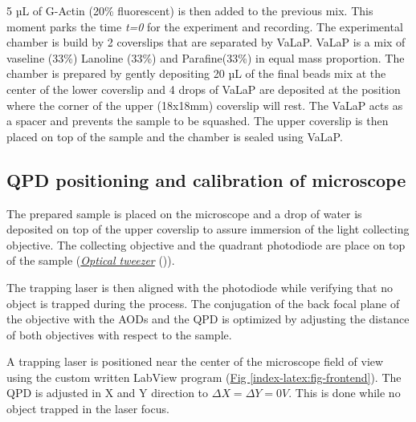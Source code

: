 \documentclass[A4paperpaper,11pt,english]{sphinxmanual}
\begin{document}
5 µL of G-Actin (20\% fluorescent) is then added to the previous mix. This
moment parks the time \emph{t=0} for the experiment and recording. The experimental chamber is
build by 2 coverslips that are separated by VaLaP. VaLaP is a mix of vaseline (33\%)
Lanoline (33\%) and Parafine(33\%) in equal mass proportion. The chamber is prepared by gently depositing 20 µL of
the final beads mix at the center of the lower coverslip and 4 drops of VaLaP
are deposited at the position where the corner of the upper (18x18mm) coverslip
will rest. The VaLaP acts as a spacer and prevents the sample to be squashed.  The
upper coverslip is then placed on top of the sample and the chamber is sealed
using VaLaP.


\subsection{QPD positioning and calibration of microscope}
\label{index-latex:laser-calibration}\label{index-latex:qpd-positioning-and-calibration-of-microscope}
The prepared sample is placed on the microscope and a drop of water is
deposited on top of the upper coverslip to assure immersion of the light
collecting objective. The collecting objective and the quadrant photodiode are
place on top of the sample ({\hyperref[index-latex:optical-tweezer]{\emph{Optical tweezer}}} ()).

The trapping laser is then aligned with the photodiode while verifying that no
object is trapped during the process. The conjugation of the back focal plane
of the objective with the AODs and the QPD is optimized by adjusting the
distance of both objectives with respect to the sample.

A trapping laser is positioned near the center of the microscope field of view
using the custom written LabView program (\hyperref[index-latex:fig-frontend]{Fig  \ref*{index-latex:fig-frontend}}). The QPD is adjusted in X and Y direction to
\(\Delta X  = \Delta Y = 0V\). This is done while no object trapped in
the  laser focus.
\end{document}
